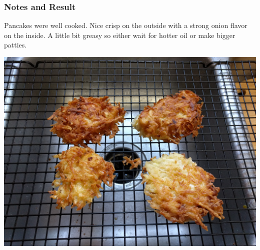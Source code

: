 \documentclass[11pt]{article}
\begin{document}
\subsubsection*{Notes and Result}
Pancakes were well cooked. Nice crisp on the outside with a strong onion flavor on the inside. A little bit greasy so either wait for hotter oil or make bigger patties.\\
\begin{center}
\includegraphics[width=.5\linewidth]{2016-11-13-Potato_Pancakes.jpg}
\end{center}
\end{document}
